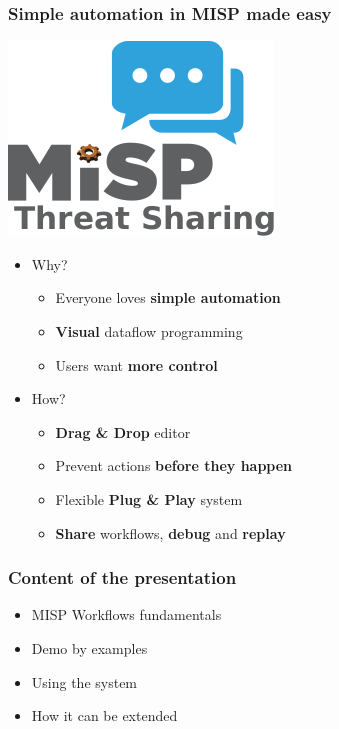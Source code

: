 \begin{frame}
    \frametitle{Simple automation in MISP made easy}
    \begin{center}
        \includegraphics[width=0.3\linewidth]{pictures/automation.png}
    \end{center}
    \begin{itemize}
        \item Why?
        \begin{itemize}
            \item Everyone loves \textbf{simple automation}
            \item \textbf{Visual} dataflow programming
            \item Users want \textbf{more control}
        \end{itemize}
        \item How?
        \begin{itemize}
            \item \textbf{Drag \& Drop} editor
            \item Prevent actions \textbf{before they happen}
            \item Flexible \textbf{Plug \& Play} system
            \item \textbf{Share} workflows, \textbf{debug} and \textbf{replay}
        \end{itemize}
    \end{itemize}
\end{frame}

\begin{frame}
    \frametitle{Content of the presentation}
    \begin{itemize}
        \item MISP Workflows fundamentals
        \item Demo by examples
        \item Using the system
        \item How it can be extended
    \end{itemize}

    \vspace*{1em}
    \begin{center}
    \end{center}
\end{frame}

